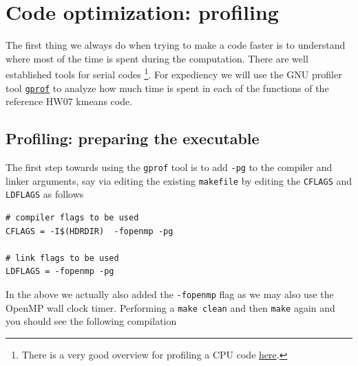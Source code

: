 


\minitoc

\section{Code optimization: profiling}

The first thing we always do when trying to make a code faster is to understand where most of the time is spent during the computation. There are well established tools for serial codes \footnote{There is a very good overview for profiling a CPU code \href{http://euccas.github.io/blog/20170827/cpu-profiling-tools-on-linux.html}{here}.}. For expediency we will use the GNU profiler tool \texttt{\href{https://sourceware.org/binutils/docs/gprof/}{gprof}} to analyze how much time is spent in each of the functions of the reference HW07 kmeans code. 

\subsection{Profiling: preparing the executable}

The first step towards using the \texttt{gprof} tool is to add \texttt{-pg} to the compiler and linker arguments, say via editing the existing \texttt{makefile} by editing the \texttt{CFLAGS} and \texttt{LDFLAGS}  as follows

\begin{verbatim}
# compiler flags to be used 
CFLAGS = -I$(HDRDIR)  -fopenmp -pg

# link flags to be used             
LDFLAGS = -fopenmp -pg
\end{verbatim}

In the above we actually also added the \texttt{-fopenmp} flag as we may also use the OpenMP wall clock timer. Performing a \texttt{make clean} and then \texttt{make} again and you should see the following compilation

